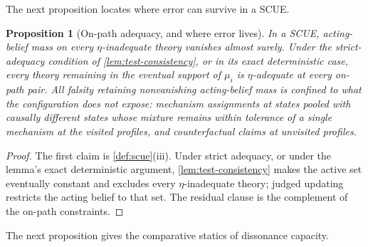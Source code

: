\documentclass[11pt]{article}
\newtheorem{proposition}[assumption]{Proposition}
\theoremstyle{definition}
\begin{document}
The next proposition locates where error can survive in a SCUE.

\begin{proposition}[On-path adequacy, and where error lives]
\label{prop:adequacy}
In a SCUE, acting-belief mass on every $\eta$-inadequate theory vanishes almost surely.
Under the strict-adequacy condition of \cref{lem:test-consistency}, or in its exact deterministic case, every theory remaining in the eventual support of $\mu_i$ is $\eta$-adequate at every on-path pair.
All falsity retaining nonvanishing acting-belief mass is confined to what the configuration does not expose: mechanism assignments at states pooled with causally different states whose mixture remains within tolerance of a single mechanism at the visited profiles, and counterfactual claims at unvisited profiles.
\end{proposition}

\begin{proof}
The first claim is \cref{def:scue}(iii).
Under strict adequacy, or under the lemma's exact deterministic argument, \cref{lem:test-consistency} makes the active set eventually constant and excludes every $\eta$-inadequate theory; judged updating restricts the acting belief to that set.
The residual clause is the complement of the on-path constraints.
\end{proof}

The next proposition gives the comparative statics of dissonance capacity.
\end{document}
